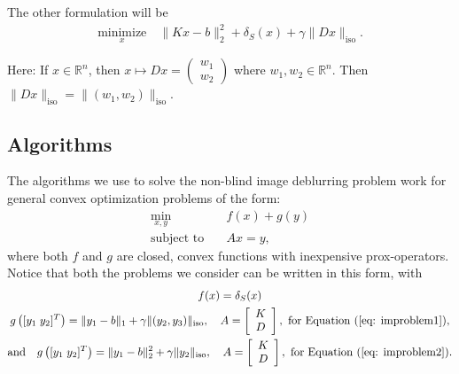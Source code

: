 \documentclass[12pt]{article}
\begin{document}
The other formulation will be 
\begin{align}
\underset{x}{\text{minimize}} \quad \| Kx-b \|^2_2 + \delta_S(x) + \gamma \|Dx \|_{\text{iso}}. 
\label{eq: improblem2} 
\end{align}

Here: If $x \in \mathbb{R}^n$, then $x \mapsto Dx =\begin{pmatrix} w_1 \\ w_2 \end{pmatrix}$ where $w_1, w_2 \in \mathbb{R}^n$. Then $\|Dx\|_{\text{iso}} = \|(w_1, w_2)\|_{\text{iso}}$. 

\subsection{Algorithms}

The algorithms we use to solve the non-blind image deblurring problem work for general
convex optimization problems of the form:
\begin{align}
\underset{x,y}{\min} \quad & f(x) + g(y) \label{eq: problem} \\
\text{subject to} \quad & Ax = y, \nonumber
\end{align}
where both $f$ and $g$ are closed, convex functions with inexpensive
prox-operators. Notice that both the problems we consider can be
written in this form, with 
\begin{gather*}
f(x) = \delta_S(x)\\
g \left( [ y_1 \; y_2  ]^T \right) = \| y_1 - b \|_1 + \gamma
\|(y_2, y_3)\|_{\text{iso}}, \quad A = \left[ \begin{array}{c} K \\
                                         D \end{array} \right], \text{ for Equation (\ref{eq:
  improblem1})},\\
\text{and} \quad g \left( [ y_1 \; y_2 ]^T \right) = \| y_1 - b \|_2^2 + \gamma
\|y_2\|_{\text{iso}}, \quad A = \left[ \begin{array}{c} K \\
                                         D \end{array} \right],  \text{ for Equation (\ref{eq:
  improblem2}).}
\end{gather*}
\end{document}
